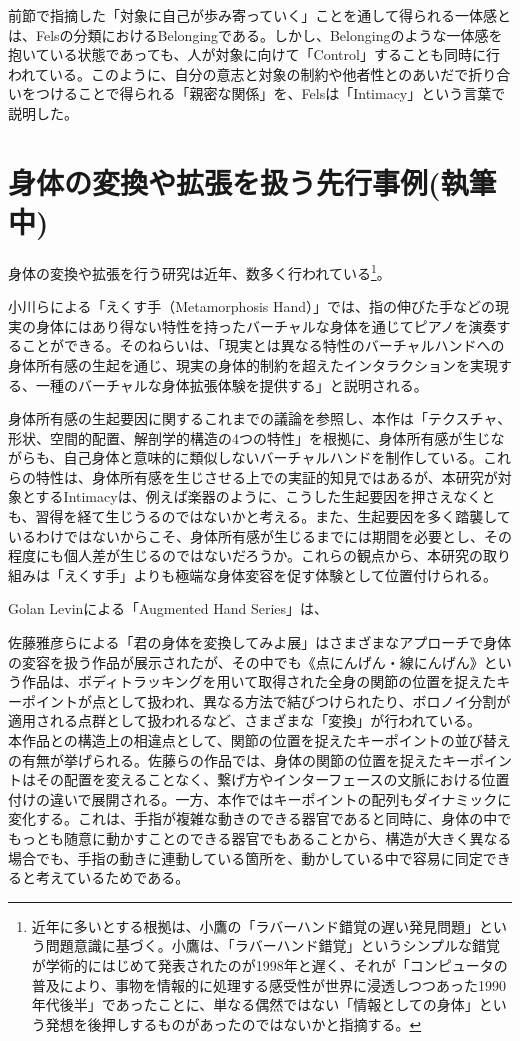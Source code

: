 前節で指摘した「対象に自己が歩み寄っていく」ことを通して得られる一体感とは、Felsの分類におけるBelongingである。しかし、Belongingのような一体感を抱いている状態であっても、人が対象に向けて「Control」することも同時に行われている。このように、自分の意志と対象の制約や他者性とのあいだで折り合いをつけることで得られる「親密な関係」を、Felsは「Intimacy」という言葉で説明した。

\section{身体の変換や拡張を扱う先行事例(執筆中)}
身体の変換や拡張を行う研究は近年、数多く行われている\footnote{近年に多いとする根拠は、小鷹の「ラバーハンド錯覚の遅い発見問題」という問題意識に基づく。小鷹は、「ラバーハンド錯覚」というシンプルな錯覚が学術的にはじめて発表されたのが1998年と遅く、それが「コンピュータの普及により、事物を情報的に処理する感受性が世界に浸透しつつあった1990年代後半」であったことに、単なる偶然ではない「情報としての身体」という発想を後押しするものがあったのではないかと指摘する\cite{kodaka}。}\cite{Kondo2020, ekusute,Kasahara2017,augmented_hand_series}。

小川らによる「えくす手（Metamorphosis Hand）」\cite{ekusute}では、指の伸びた手などの現実の身体にはあり得ない特性を持ったバーチャルな身体を通じてピアノを演奏することができる。そのねらいは、「現実とは異なる特性のバーチャルハンドへの身体所有感の生起を通じ、現実の身体的制約を超えたインタラクションを実現する、一種のバーチャルな身体拡張体験を提供する」と説明される。

身体所有感の生起要因に関するこれまでの議論を参照し、本作は「テクスチャ、形状、空間的配置、解剖学的構造の4つの特性」を根拠に、身体所有感が生じながらも、自己身体と意味的に類似しないバーチャルハンドを制作している。これらの特性は、身体所有感を生じさせる上での実証的知見ではあるが、本研究が対象とするIntimacyは、例えば楽器のように、こうした生起要因を押さえなくとも、習得を経て生じうるのではないかと考える。また、生起要因を多く踏襲しているわけではないからこそ、身体所有感が生じるまでには期間を必要とし、その程度にも個人差が生じるのではないだろうか。これらの観点から、本研究の取り組みは「えくす手」よりも極端な身体変容を促す体験として位置付けられる。

Golan Levinによる「Augmented Hand Series」\cite{augmented_hand_series}は、

佐藤雅彦らによる「君の身体を変換してみよ展」はさまざまなアプローチで身体の変容を扱う作品が展示されたが、その中でも《点にんげん・線にんげん》\cite{sato_icc}という作品は、ボディトラッキングを用いて取得された全身の関節の位置を捉えたキーポイントが点として扱われ、異なる方法で結びつけられたり、ボロノイ分割が適用される点群として扱われるなど、さまざまな「変換」が行われている。\\
本作品との構造上の相違点として、関節の位置を捉えたキーポイントの並び替えの有無が挙げられる。佐藤らの作品では、身体の関節の位置を捉えたキーポイントはその配置を変えることなく、繋げ方やインターフェースの文脈における位置付けの違いで展開される。一方、本作ではキーポイントの配列もダイナミックに変化する。これは、手指が複雑な動きのできる器官であると同時に、身体の中でもっとも随意に動かすことのできる器官でもあることから、構造が大きく異なる場合でも、手指の動きに連動している箇所を、動かしている中で容易に同定できると考えているためである。


